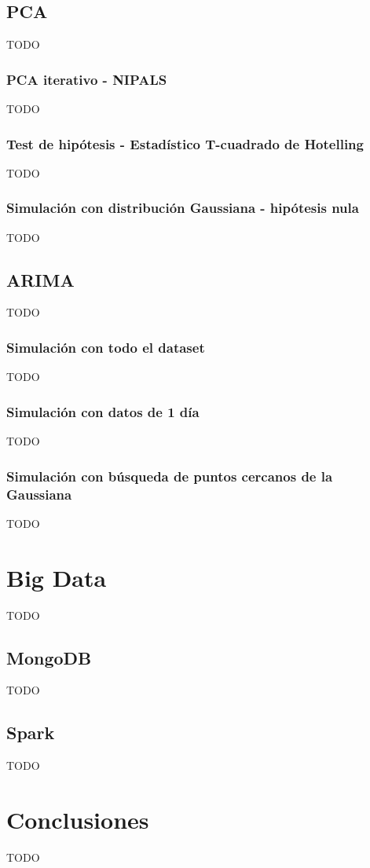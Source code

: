 \documentclass[11pt,spanish,listoffigures,listoftables]{tfgetsinf}
\begin{document}
    \section{PCA}
    TODO
        \subsection{PCA iterativo - NIPALS}
        TODO
        \subsection{Test de hipótesis - Estadístico T-cuadrado de Hotelling}
        TODO
        \subsection{Simulación con distribución Gaussiana - hipótesis nula}
        TODO
    
    \section{ARIMA}
    TODO
        \subsection{Simulación con todo el dataset}
        TODO
        \subsection{Simulación con datos de 1 día}
        TODO
        \subsection{Simulación con búsqueda de puntos cercanos de la Gaussiana}
        TODO
    
    \chapter{Big Data}
    TODO
        \section{MongoDB}
        TODO
        \section{Spark}
        TODO
 
\chapter{Conclusiones}
TODO
\end{document}
